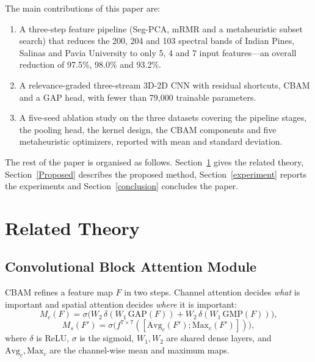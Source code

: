 \documentclass[conference]{IEEEtran}
\begin{document}
	The main contributions of this paper are:
	\begin{enumerate}
		\item A three-step feature pipeline (Seg-PCA, mRMR and a metaheuristic subset 
		search) that reduces the 200, 204 and 103 spectral bands of Indian Pines, 
		Salinas and Pavia University to only 5, 4 and 7 input features—an overall 
		reduction of 97.5\%, 98.0\% and 93.2\%.
		\item A relevance-graded three-stream 3D-2D CNN with residual shortcuts, CBAM and a GAP head, with fewer than 79,000 trainable parameters.
		\item A five-seed ablation study on the three datasets covering the pipeline stages, the pooling head, the kernel design, the CBAM components and five metaheuristic optimizers, reported with mean and standard deviation.
	\end{enumerate}
	
	The rest of the paper is organised as follows. Section~\ref{related_theory} gives the related theory, Section~\ref{Proposed} describes the proposed method, Section~\ref{experiment} reports the experiments and Section~\ref{conclusion} concludes the paper.
	
	\section{Related Theory} \label{related_theory}
	
	\subsection{Convolutional Block Attention Module}
	CBAM\cite{cbam} refines a feature map $F$ in two steps. Channel attention decides \textit{what} is important and spatial attention decides \textit{where} it is important:
	\begin{equation}
		M_c(F)=\sigma\big(W_2\,\delta(W_1\,\mathrm{GAP}(F))+W_2\,\delta(W_1\,\mathrm{GMP}(F))\big),
	\end{equation}
	\begin{equation}
		M_s(F')=\sigma\big(f^{7\times7}([\mathrm{Avg}_c(F');\mathrm{Max}_c(F')])\big),
	\end{equation}
	where $\delta$ is ReLU, $\sigma$ is the sigmoid, $W_1,W_2$ are shared dense layers, and $\mathrm{Avg}_c,\mathrm{Max}_c$ are the channel-wise mean and maximum maps.
	
\end{document}
